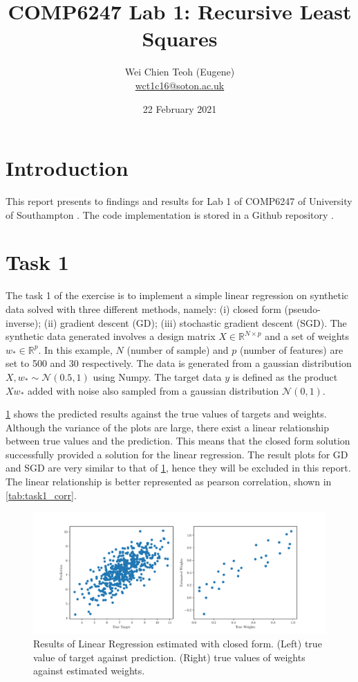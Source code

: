 \documentclass{article}
\title{COMP6247 Lab 1: Recursive Least Squares}
\author{Wei Chien Teoh (Eugene)\\\bigskip \href{mailto:wct1c16@soton.ac.uk}{wct1c16@soton.ac.uk}}
\date{22 February 2021}
\begin{document}
\begin{titlepage}
    \maketitle
\end{titlepage}

\section{Introduction}

This report presents to findings and results for Lab 1 of COMP6247 of University of Southampton \cite{lab1}. The code implementation is stored in a Github repository \cite{github}.

\section{Task 1} \label{section:task-1}

The task 1 of the exercise is to implement a simple linear regression on synthetic data solved with three different methods, namely: (i) closed form (pseudo-inverse); (ii) gradient descent (GD); (iii) stochastic gradient descent (SGD). The synthetic data generated involves a design matrix $X \in \mathbb{R}^{N \times p}$ and a set of weights $w_* \in \mathbb{R}^p$. In this example, $N$ (number of sample) and $p$ (number of features) are set to 500 and 30 respectively. The data is generated from a gaussian distribution $X, w_* \sim \mathcal{N}(0.5, 1)$ using Numpy. The target data $y$ is defined as the product $Xw_*$ added with noise also sampled from a gaussian distribution $\mathcal{N}(0, 1)$.

\cref{fig:lr_closed} shows the predicted results against the true values of targets and weights. Although the variance of the plots are large, there exist a linear relationship between true values and the prediction. This means that the closed form solution successfully provided a solution for the linear regression. The result plots for GD and SGD are very similar to that of \cref{fig:lr_closed}, hence they will be excluded in this report. The linear relationship is better represented as pearson correlation, shown in \cref{tab:task1_corr}.

\begin{figure}[h!]
    \centering
    \includegraphics[width=\textwidth]{Figures/closed.pdf}
    \caption{Results of Linear Regression estimated with closed form. (Left) true value of target against prediction. (Right) true values of weights against estimated weights.}
    \label{fig:lr_closed}
\end{figure}
\end{document}
